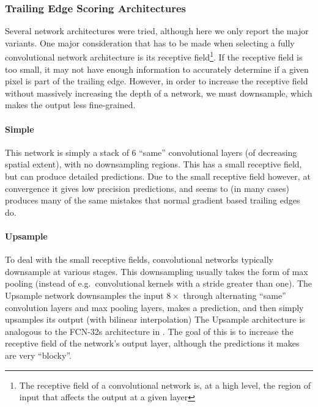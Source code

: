 \subsubsection{Trailing Edge Scoring Architectures} 
\label{sec:te_arch}

Several network architectures were tried, although here we only report the major variants.
One major consideration that has to be made when selecting a fully convolutional network architecture is its receptive field\footnote{The receptive field of a convolutional network is, at a high level, the region of input that affects the output at a given layer}.
If the receptive field is too small, it may not have enough information to accurately determine if a given pixel is part of the trailing edge.
However, in order to increase the receptive field without massively increasing the depth of a network, we must downsample, which makes the output less fine-grained.

\paragraph{Simple}
This network is simply a stack of $6$ ``same'' convolutional layers (of decreasing spatial extent), with no downsampling regions.
This has a small receptive field, but can produce detailed predictions.
Due to the small receptive field however, at convergence it gives low precision predictions, and seems to (in many cases) produces many of the same mistakes that normal gradient based trailing edges do.

\paragraph{Upsample}
To deal with the small receptive fields, convolutional networks typically downsample at various stages. 
This downsampling usually takes the form of max pooling (instead of e.g.\ convolutional kernels with a stride greater than one).
The Upsample network downsamples the input $8\times$ through alternating ``same'' convolution layers and max pooling layers, makes a prediction, and then simply upsamples its output (with bilinear interpolation)
The Upsample architecture is analogous to the FCN-32s architecture in \cite{long2015fully}.%
The goal of this is to increase the receptive field of the network's output layer, although the predictions it makes are very ``blocky''.

